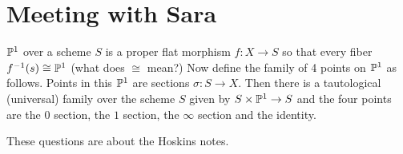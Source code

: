 \documentclass[12pt]{article}
\begin{document}
\section{Meeting with Sara}
\begin{definition}
$\P^1$ over a scheme $S$ is a proper flat morphism $f:X\to S$ so that every fiber $f^{-1}(s) \cong \P^1$ (what does $\cong$ mean?) Now define the family of 4 points on $\P^1$ as follows. Points in this $\P^1$ are sections $\sigma:S\to X$. Then there is a tautological (universal) family over the scheme $S$ given by $S\times\P^1\to S$ and the four points are the $0$ section, the $1$ section, the $\infty$ section and the identity.
\end{definition}
These questions are about the Hoskins notes.

\hfill


\hfill 


\hfill

\end{document}
